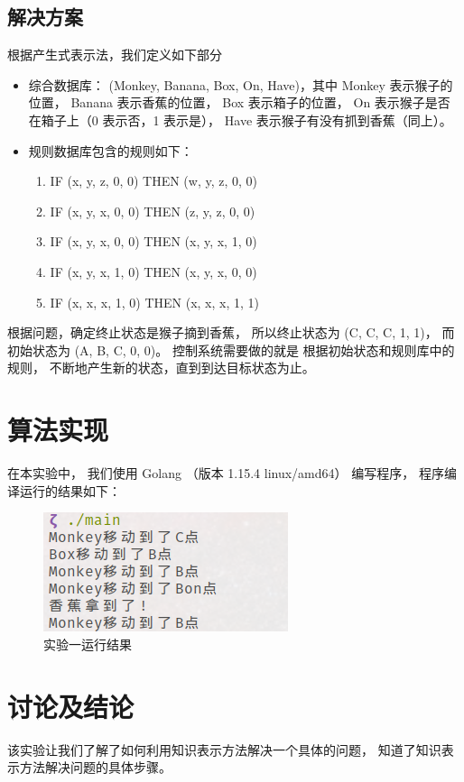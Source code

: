 \documentclass[12pt,onecolumn]{report}
\theoremstyle{plain}
\numberwithin{figure}{section}
\begin{document}
\subsection{解决方案}
根据产生式表示法，我们定义如下部分
\begin{itemize}[fullwidth,itemindent=\parindent]
\item 综合数据库： (Monkey, Banana, Box, On, Have)，其中
  Monkey 表示猴子的位置，
  Banana 表示香蕉的位置，
  Box 表示箱子的位置，
  On 表示猴子是否在箱子上（0 表示否，1 表示是），
  Have 表示猴子有没有抓到香蕉（同上）。
\item 规则数据库包含的规则如下：
  \begin{enumerate}[fullwidth,itemindent=\parindent,label=r\arabic*:]
  \item IF (x, y, z, 0, 0) THEN (w, y, z, 0, 0)
  \item IF (x, y, x, 0, 0) THEN (z, y, z, 0, 0)
  \item IF (x, y, x, 0, 0) THEN (x, y, x, 1, 0)
  \item IF (x, y, x, 1, 0) THEN (x, y, x, 0, 0)
  \item IF (x, x, x, 1, 0) THEN (x, x, x, 1, 1)
  \end{enumerate}
\end{itemize}

根据问题，确定终止状态是猴子摘到香蕉，
所以终止状态为 (C, C, C, 1, 1)，
而初始状态为 (A, B, C, 0, 0)。
控制系统需要做的就是
根据初始状态和规则库中的规则，
不断地产生新的状态，直到到达目标状态为止。

\section{算法实现}
在本实验中，
我们使用 Golang （版本 1.15.4 linux/amd64） 编写程序，
程序编译运行的结果如下：
\begin{figure}[htbp]
  \centering
  \includegraphics{figures/monkey.png}
  \caption{实验一运行结果}
\end{figure}

\section{讨论及结论}
该实验让我们了解了如何利用知识表示方法解决一个具体的问题，
知道了知识表示方法解决问题的具体步骤。
\end{document}
